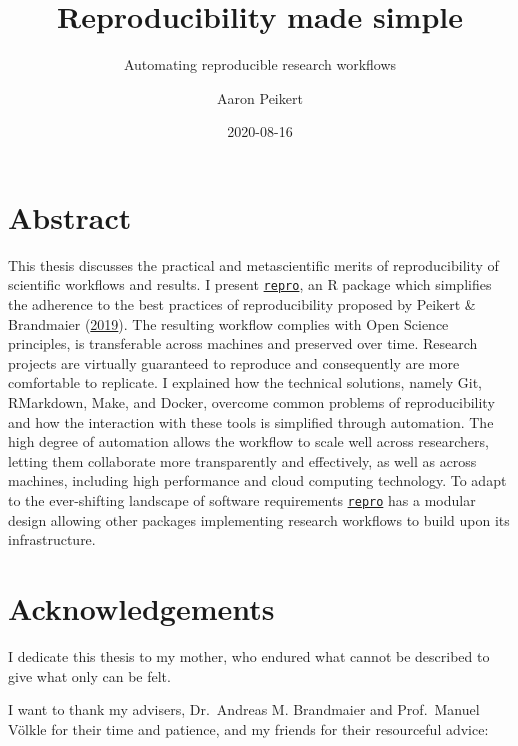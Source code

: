 \documentclass[12pt,a4paper,twoside]{article}
\title{Reproducibility made simple}
\subtitle{Automating reproducible research workflows}
\author{Aaron Peikert}
\date{2020-08-16}
\begin{document}
\maketitle

{
\setcounter{tocdepth}{2}
\tableofcontents
}
\newpage\null\thispagestyle{empty}\newpage

\hypertarget{abstract}{%
\section*{Abstract}\label{abstract}}

This thesis discusses the practical and metascientific merits of reproducibility of scientific workflows and results. I present \href{https://github.com/aaronpeikert/repro}{\texttt{repro}}, an R package which simplifies the adherence to the best practices of reproducibility proposed by Peikert \& Brandmaier (\protect\hyperlink{ref-peikertReproducibleDataAnalysis2019}{2019}).
The resulting workflow complies with Open Science principles, is transferable across machines and preserved over time.
Research projects are virtually guaranteed to reproduce and consequently are more comfortable to replicate.
I explained how the technical solutions, namely Git, RMarkdown, Make, and Docker, overcome common problems of reproducibility and how the interaction with these tools is simplified through automation.
The high degree of automation allows the workflow to scale well across researchers, letting them collaborate more transparently and effectively, as well as across machines, including high performance and cloud computing technology.
To adapt to the ever-shifting landscape of software requirements \href{https://github.com/aaronpeikert/repro}{\texttt{repro}} has a modular design allowing other packages implementing research workflows to build upon its infrastructure.

\hypertarget{acknowledgements}{%
\section*{Acknowledgements}\label{acknowledgements}}

I dedicate this thesis to my mother, who endured what cannot be described to give what only can be felt.

I want to thank my advisers, Dr.~Andreas M. Brandmaier and Prof.~Manuel Völkle for their time and patience, and my friends for their resourceful advice:
\end{document}
